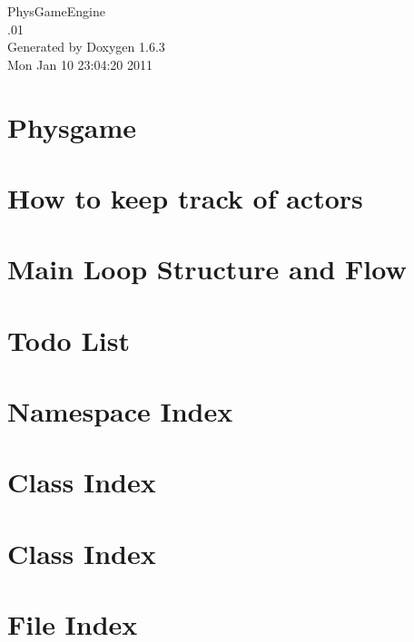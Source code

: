 \documentclass[a4paper]{book}
\begin{document}
\hypersetup{pageanchor=false}
\begin{titlepage}
\vspace*{7cm}
\begin{center}
{\Large PhysGameEngine \\[1ex]\large .01 }\\
\vspace*{1cm}
{\large Generated by Doxygen 1.6.3}\\
\vspace*{0.5cm}
{\small Mon Jan 10 23:04:20 2011}\\
\end{center}
\end{titlepage}
\clearemptydoublepage
{}
\tableofcontents
\clearemptydoublepage
{}
\hypersetup{pageanchor=true}
\chapter{Physgame}
\label{index}\hypertarget{index}{}
\chapter{How to keep track of actors}
\label{actorcontainer1}
\hypertarget{actorcontainer1}{}

\chapter{Main Loop Structure and Flow}
\label{mainloop1}
\hypertarget{mainloop1}{}

\chapter{Todo List}
\label{todo}
\hypertarget{todo}{}

\chapter{Namespace Index}

\chapter{Class Index}

\chapter{Class Index}

\chapter{File Index}

\end{document}
